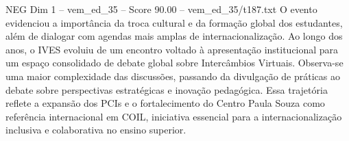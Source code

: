 \begin{textsample}{NEG Dim 1 – vem\_ed\_35 – Score 90.00 – vem\_ed\_35/t187.txt}
O evento evidenciou a importância da troca cultural e da formação global dos estudantes, além de dialogar com agendas mais amplas de internacionalização.
Ao longo dos anos, o IVES evoluiu de um encontro voltado à apresentação institucional para um espaço consolidado de debate global sobre Intercâmbios Virtuais.
Observa-se uma maior complexidade das discussões, passando da divulgação de práticas ao debate sobre perspectivas estratégicas e inovação pedagógica.
Essa trajetória reflete a expansão dos PCIs e o fortalecimento do Centro Paula Souza como referência internacional em COIL, iniciativa essencial para a internacionalização inclusiva e colaborativa no ensino superior.

\end{textsample}
